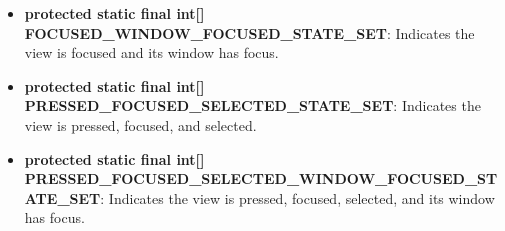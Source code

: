\documentclass{report}
\begin{document}
\begin{itemize}
\begin{itemize}
                \item \textbf{protected static final int[] FOCUSED\_WINDOW\_FOCUSED\_STATE\_SET}:  
                    Indicates the view is focused and its window has focus.

                \item \textbf{protected static final int[] PRESSED\_FOCUSED\_SELECTED\_STATE\_SET}:  
                    Indicates the view is pressed, focused, and selected.

                \item \textbf{protected static final int[] PRESSED\_FOCUSED\_SELECTED\_WINDOW\_FOCUSED\_STATE\_SET}:  
                    Indicates the view is pressed, focused, selected, and its window has focus.
            \end{itemize}


\end{itemize}
\end{document}
